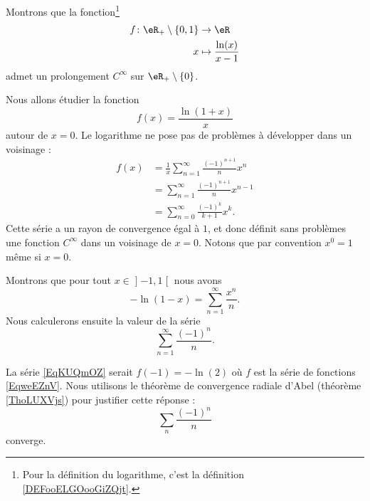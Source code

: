 \begin{example}
    Montrons que la fonction\footnote{Pour la définition du logarithme, c'est la définition \ref{DEFooELGOooGiZQjt}.}
    \begin{equation}
        \begin{aligned}
            f\colon \eR_+\setminus\{ 0,1 \}&\to \eR \\
            x&\mapsto \frac{ \ln(x) }{ x-1 } 
        \end{aligned}
    \end{equation}
    admet un prolongement \( C^{\infty}\) sur \( \eR_+\setminus\{ 0 \}\).

    Nous allons étudier la fonction
    \begin{equation}
        f(x)=\frac{ \ln(1+x) }{ x }
    \end{equation}
    autour de \( x=0\). Le logarithme ne pose pas de problèmes à développer dans un voisinage :
    \begin{subequations}
        \begin{align}
            f(x)&=\frac{1}{ x }\sum_{n=1}^{\infty}\frac{ (-1)^{n+1} }{ n }x^n\\
            &=\sum_{n=1}^{\infty}\frac{ (-1)^{n+1} }{ n }x^{n-1}\\
            &=\sum_{n=0}^{\infty}\frac{ (-1)^k }{ k+1 }x^k.
        \end{align}
    \end{subequations}
    Cette série a un rayon de convergence égal à \( 1\), et donc définit sans problèmes une fonction \( C^{\infty}\) dans un voisinage de \( x=0\). Notons que par convention \( x^0=1\) même si \( x=0\).
\end{example}

\begin{example}     \label{EXooKNTPooKiRExX}
    Montrons que pour tout \( x\in\mathopen] -1 , 1 \mathclose[\) nous avons
    \begin{equation}        \label{EqweEZnV}
        -\ln(1-x)=\sum_{n=1}^{\infty}\frac{ x^n }{ n }.
    \end{equation}
    Nous calculerons ensuite la valeur de la série
    \begin{equation}    \label{EqKUQmOZ}
        \sum_{n=1}^{\infty}\frac{ (-1)^n }{ n }.
    \end{equation}

    La série \eqref{EqKUQmOZ} serait \( f(-1)=-\ln(2)\) où \( f\) est la série de fonctions \eqref{EqweEZnV}. Nous utilisons le théorème de convergence radiale d'Abel (théorème \ref{ThoLUXVjs}) pour justifier cette réponse :
    \begin{equation}
        \sum_n\frac{ (-1)^n }{ n }
    \end{equation}
    converge.
\end{example}

